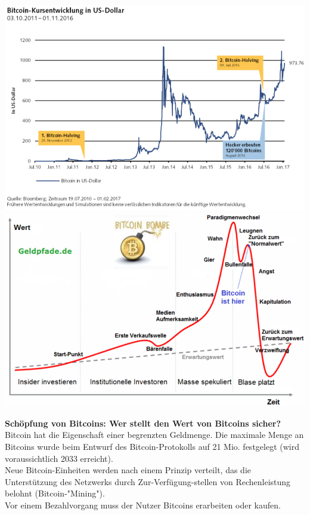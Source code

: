 \begin{multicols}{2}
	\includegraphics[width=\linewidth]{images/bitcoin1.png}
	\columnbreak
	\includegraphics[width=\linewidth]{images/bitcoin2.png}
\end{multicols}
\begin{minipage}{0.5\linewidth}
	\textbf{Schöpfung von Bitcoins: Wer stellt den Wert von Bitcoins sicher?}\\
	Bitcoin hat die Eigenschaft einer begrenzten Geldmenge. Die maximale Menge an Bitcoins wurde beim Entwurf des Bitcoin-Protokolls auf 21 Mio. festgelegt (wird voraussichtlich 2033 erreicht).\\
	Neue Bitcoin-Einheiten werden nach einem Prinzip verteilt, das die Unterstützung des Netzwerks durch Zur-Verfügung-stellen von Rechenleistung belohnt (Bitcoin-"Mining").\\
	Vor einem Bezahlvorgang muss der Nutzer Bitcoins erarbeiten oder kaufen.
\end{minipage}
